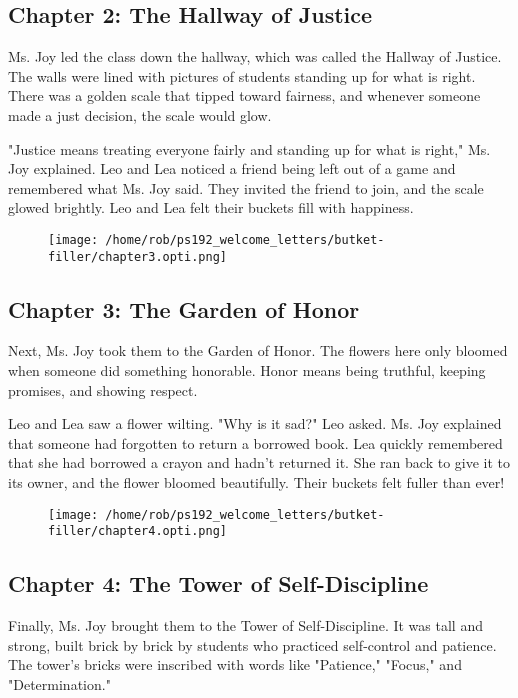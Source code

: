 \documentclass[11pt]{article}
\begin{document}
\subsection{Chapter 2: The Hallway of Justice}
\label{sec:org77eb89c}
Ms. Joy led the class down the hallway, which was called the Hallway of Justice. The walls were lined with pictures of students standing up for what is right. There was a golden scale that tipped toward fairness, and whenever someone made a just decision, the scale would glow.

"Justice means treating everyone fairly and standing up for what is right," Ms. Joy explained. Leo and Lea noticed a friend being left out of a game and remembered what Ms. Joy said. They invited the friend to join, and the scale glowed brightly. Leo and Lea felt their buckets fill with happiness.
\newpage
\begin{figure}[h]  %
  \centering \texttt{[image: /home/rob/ps192\_welcome\_letters/butket-filler/chapter3.opti.png]}
  \label{fig:fronpage bottom_image}
\end{figure}
\subsection{Chapter 3: The Garden of Honor}
\label{sec:orgc990a13}
Next, Ms. Joy took them to the Garden of Honor. The flowers here only bloomed when someone did something honorable. Honor means being truthful, keeping promises, and showing respect.

Leo and Lea saw a flower wilting. "Why is it sad?" Leo asked. Ms. Joy explained that someone had forgotten to return a borrowed book. Lea quickly remembered that she had borrowed a crayon and hadn’t returned it. She ran back to give it to its owner, and the flower bloomed beautifully. Their buckets felt fuller than ever!
\newpage
\begin{figure}[h]  %
  \centering \texttt{[image: /home/rob/ps192\_welcome\_letters/butket-filler/chapter4.opti.png]}
  \label{fig:fronpage bottom_image}
\end{figure}
\subsection{Chapter 4: The Tower of Self-Discipline}
\label{sec:orgea013ee}
Finally, Ms. Joy brought them to the Tower of Self-Discipline. It was tall and strong, built brick by brick by students who practiced self-control and patience. The tower’s bricks were inscribed with words like "Patience," "Focus," and "Determination."
\end{document}
